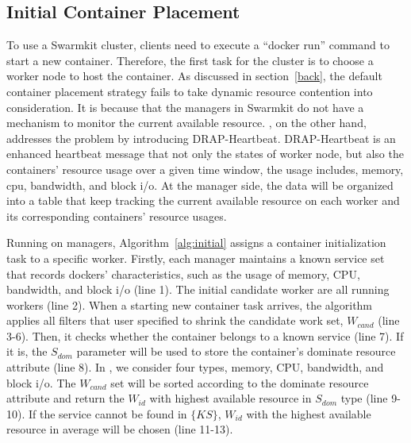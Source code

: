\subsection{Initial Container Placement}
To use a Swarmkit cluster, clients need to execute a ``docker run'' command to start a new container.
Therefore, the first task for the cluster is to choose a worker node to host the container.
As discussed in section~\ref{back}, the default container placement strategy fails to take dynamic 
resource contention into consideration. It is because that the managers in Swarmkit 
do not have a mechanism to monitor the current available resource. 
\sol, on the other hand, addresses the problem by introducing DRAP-Heartbeat.
DRAP-Heartbeat is an enhanced heartbeat message that not only the states of worker node, but also the
containers' resource usage over a given time window, the usage includes, memory, cpu, bandwidth, and block i/o.
At the manager side, the data will be organized into a table that keep tracking the current available resource 
on each worker and its corresponding containers' resource usages.

Running on managers, Algorithm~\ref{alg:initial} assigns a container initialization task to a specific worker.
Firstly, each manager maintains a known service set that records dockers' characteristics, such as the usage of memory, CPU, bandwidth, and block i/o (line 1).
The initial candidate worker are all running workers (line 2).
When a starting new container task arrives, the algorithm applies all filters that user specified to shrink the candidate work set, $W_{cand}$ (line 3-6).
Then, it checks whether the container belongs to a known service (line 7). If it is, the $S_{dom}$ parameter will be used to store the container's dominate 
resource attribute (line 8). In \sol, we consider four types, memory, CPU, bandwidth, and block i/o.
The $W_{cand}$ set will be sorted according to the dominate resource attribute and 
return the $W_{id}$ with highest available resource in $S_{dom}$ type (line 9-10).
If the service cannot be found in $\{KS\}$, $W_{id}$ with the highest available resource in average will be chosen (line 11-13).

